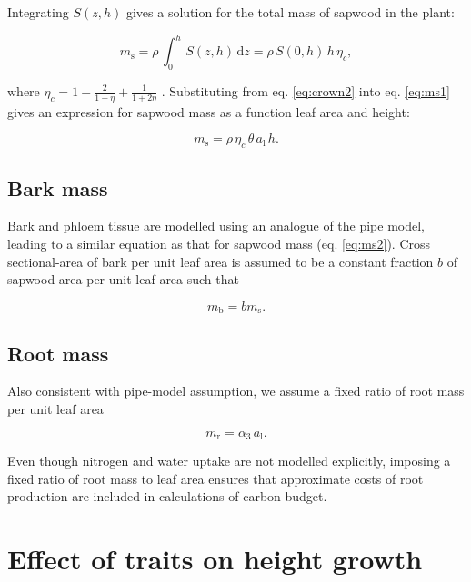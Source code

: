 \documentclass[12pt, a4paper]{article}
\begin{document}
\begin{appendices}
Integrating $S(z,h)$ gives a solution for the total mass of sapwood in
the plant:

\begin{equation}\label{eq:ms1}
m_\textrm{s}=\rho \, \int_0^h \, S(z,h) \, \textrm{d}z= \rho \, S(0,h) \, h \, \eta_c, \end{equation}

where
$\eta_c=1-\frac{2}{1+\eta} + \frac{1}{1+2\eta}$ \citep{yokozawa-1995}.
Substituting from eq. \ref{eq:crown2} into eq. \ref{eq:ms1} gives an
expression for sapwood mass as a function leaf area and height:

\begin{equation}\label{eq:ms2}
m_\textrm{s}=\rho \, \eta_c \, \theta \, a_\textrm{l} \, h.
\end{equation}

\subsection{Bark mass}\label{bark-mass}

Bark and phloem tissue are modelled using an analogue of the pipe model,
leading to a similar equation as that for sapwood mass (eq.
\ref{eq:ms2}). Cross sectional-area of bark per unit leaf area is
assumed to be a constant fraction $b$ of sapwood area per unit leaf
area such that

\begin{equation}\label{eq:mb}
m_\textrm{b}=b m_\textrm{s}.
\end{equation}

\subsection{Root mass}\label{root-mass}

Also consistent with pipe-model assumption, we assume a fixed ratio of
root mass per unit leaf area

\begin{equation}\label{eq:mr}
m_\textrm{r}=\alpha_3 \, a_\textrm{l}.
\end{equation}

Even though nitrogen and water uptake are not modelled explicitly,
imposing a fixed ratio of root mass to leaf area ensures that
approximate costs of root production are included in calculations of
carbon budget.

\section{Effect of traits on height growth} \label{app:traits_max}


\end{appendices}
\end{document}
